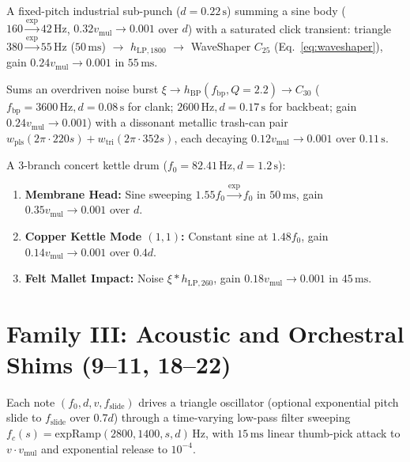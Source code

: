 \begin{definition}
A fixed-pitch industrial sub-punch ($d = 0.22\,\text{s}$) summing a sine body ($160 \xrightarrow{\exp} 42\,\text{Hz}$, $0.32 v_{\mathrm{mul}} \to 0.001$ over $d$) with a saturated click transient: triangle $380 \xrightarrow{\exp} 55\,\text{Hz}$ ($50\,\text{ms}$) $\to$ $h_{\mathrm{LP}, 1800}$ $\to$ WaveShaper $C_{25}$ (Eq.~\ref{eq:waveshaper}), gain $0.24 v_{\mathrm{mul}} \to 0.001$ in $55\,\text{ms}$.
\end{definition}

\begin{definition}
Sums an overdriven noise burst $\xi \to h_{\mathrm{BP}}(f_{\mathrm{bp}}, Q = 2.2) \to C_{30}$ ($f_{\mathrm{bp}} = 3600\,\text{Hz}, d = 0.08\,\text{s}$ for clank; $2600\,\text{Hz}, d = 0.17\,\text{s}$ for backbeat; gain $0.24 v_{\mathrm{mul}} \to 0.001$) with a dissonant metallic trash-can pair $w_{\mathrm{pls}}(2\pi\cdot 220 s) + w_{\mathrm{tri}}(2\pi\cdot 352 s)$, each decaying $0.12 v_{\mathrm{mul}} \to 0.001$ over $0.11\,\text{s}$.
\end{definition}

\begin{definition}
A 3-branch concert kettle drum ($f_0 = 82.41\,\text{Hz}, d = 1.2\,\text{s}$):
\begin{enumerate}[leftmargin=1.5em]
  \item \textbf{Membrane Head:} Sine sweeping $1.55 f_0 \xrightarrow{\exp} f_0$ in $50\,\text{ms}$, gain $0.35 v_{\mathrm{mul}} \to 0.001$ over $d$.
  \item \textbf{Copper Kettle Mode $(1,1)$:} Constant sine at $1.48 f_0$, gain $0.14 v_{\mathrm{mul}} \to 0.001$ over $0.4d$.
  \item \textbf{Felt Mallet Impact:} Noise $\xi * h_{\mathrm{LP}, 260}$, gain $0.18 v_{\mathrm{mul}} \to 0.001$ in $45\,\text{ms}$.
\end{enumerate}
\end{definition}

\section{Family III: Acoustic and Orchestral Shims (9--11, 18--22)}
\label{sec:fam-orch}

\begin{definition}
Each note $(f_0, d, v, f_{\mathrm{slide}})$ drives a triangle oscillator (optional exponential pitch slide to $f_{\mathrm{slide}}$ over $0.7d$) through a time-varying low-pass filter sweeping $f_c(s) = \mathrm{expRamp}(2800, 1400, s, d)\,\text{Hz}$, with $15\,\text{ms}$ linear thumb-pick attack to $v\cdot v_{\mathrm{mul}}$ and exponential release to $10^{-4}$.
\end{definition}

